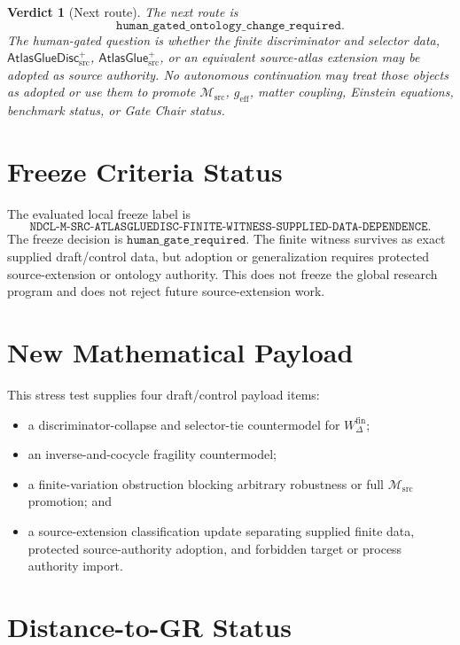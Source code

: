 \documentclass[11pt]{article}
\newcommand{\Msrc}{\mathcal{M}_{\mathrm{src}}}
\newcommand{\geff}{g_{\mathrm{eff}}}
\newcommand{\AtlasGlue}{\mathsf{AtlasGlue}_{\mathrm{src}}^{+}}
\newcommand{\AtlasGlueDisc}{\mathsf{AtlasGlueDisc}_{\mathrm{src}}^{+}}
\newcommand{\Wfin}{W_{\Delta}^{\mathrm{fin}}}
\newtheorem{verdict}{Verdict}
\begin{document}
\begin{verdict}[Next route]
The next route is
\[
  \texttt{human\_gated\_ontology\_change\_required}.
\]
The human-gated question is whether the finite discriminator and selector
data, \(\AtlasGlueDisc\), \(\AtlasGlue\), or an equivalent source-atlas
extension may be adopted as source authority. No autonomous continuation may
treat those objects as adopted or use them to promote \(\Msrc\), \(\geff\),
matter coupling, Einstein equations, benchmark status, or Gate Chair status.
\end{verdict}

\section{Freeze Criteria Status}

The evaluated local freeze label is
\[
\texttt{NDCL-M-SRC-ATLASGLUEDISC-FINITE-WITNESS-SUPPLIED-DATA-DEPENDENCE}.
\]
The freeze decision is \(\texttt{human\_gate\_required}\). The finite witness
survives as exact supplied draft/control data, but adoption or generalization
requires protected source-extension or ontology authority. This does not
freeze the global research program and does not reject future source-extension
work.

\section{New Mathematical Payload}

This stress test supplies four draft/control payload items:
\begin{itemize}
  \item a discriminator-collapse and selector-tie countermodel for
  \(\Wfin\);
  \item an inverse-and-cocycle fragility countermodel;
  \item a finite-variation obstruction blocking arbitrary robustness or full
  \(\Msrc\) promotion; and
  \item a source-extension classification update separating supplied finite
  data, protected source-authority adoption, and forbidden target or process
  authority import.
\end{itemize}

\section{Distance-to-GR Status}
\end{document}
